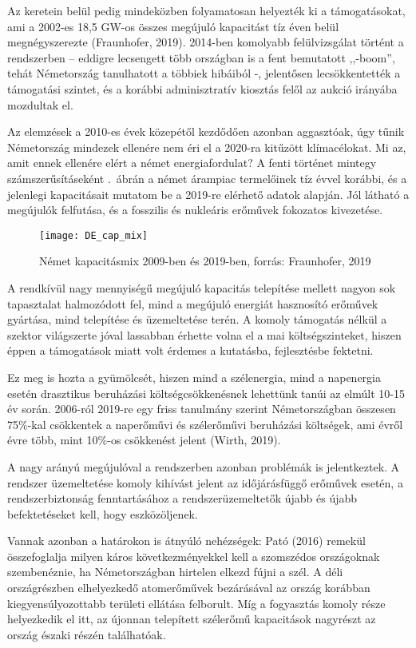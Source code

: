 \documentclass[twoside, magyar, showtrims]{corvinusphd}
\begin{document}
Az  keretein belül pedig
mindeközben folyamatosan helyezték ki a támogatásokat,
ami a 2002-es 18,5 GW-os összes megújuló
kapacitást tíz éven belül megnégyszerezte
(Fraunhofer, 2019).
2014-ben komolyabb felülvizsgálat történt a rendszerben -- 
eddigre lecsengett több országban is a
fent bemutatott ,,-boom'', tehát Németország
tanulhatott a többiek hibáiból -,
jelentősen lecsökkentették a támogatási szintet,
és a korábbi adminisztratív kiosztás felől 
az aukció irányába mozdultak el.

Az elemzések a 2010-es évek közepétől
kezdődően azonban aggasztóak, úgy tűnik
Németország mindezek ellenére nem éri el
a 2020-ra kitűzött klímacélokat. 
Mi az, amit ennek ellenére elért a német energiafordulat? 
A fenti történet mintegy számszerűsításeként .~ábrán
a német árampiac termelőinek tíz évvel korábbi,
és a jelenlegi kapacitásait mutatom be a
2019-re elérhető adatok alapján. Jól látható a megújulók
felfutása, és a fosszilis és nukleáris erőművek fokozatos kivezetése.

\begin{figure}
    \centering
    \texttt{[image: DE\_cap\_mix]}
    \caption{Német kapacitásmix 2009-ben és 2019-ben, forrás: Fraunhofer, 2019}
    \label{fig:DE_cap_mix}
\end{figure}

A rendkívül nagy mennyiségű megújuló
kapacitás telepítése mellett nagyon sok tapasztalat
halmozódott fel, mind a megújuló energiát hasznosító
erőművek gyártása, mind telepítése és üzemeltetése
terén. A komoly támogatás nélkül a szektor
világszerte jóval lassabban érhette volna el a mai költségszinteket,
hiszen éppen a támogatások miatt
volt érdemes a kutatásba, fejlesztésbe fektetni.

Ez meg is hozta a gyümölcsét, hiszen mind a szélenergia,
mind a napenergia esetén drasztikus
beruházási költségcsökkenésnek
lehettünk tanúi az elmúlt 10-15 év során.
2006-ról 2019-re egy friss tanulmány
szerint Németországban összesen 75\%-kal
csökkentek a naperőművi és szélerőművi 
beruházási költségek, ami évről évre több,
mint 10\%-os csökkenést jelent (Wirth, 2019).
\label{invcsokken}

A nagy arányú megújulóval a rendszerben
azonban problémák is jelentkeztek.
A rendszer üzemeltetése komoly kihívást
jelent az időjárásfüggő erőművek esetén,
a rendszerbiztonság fenntartásához a rendszerüzemeltetők
újabb és újabb befektetéseket
kell, hogy eszközöljenek.

Vannak azonban a határokon is átnyúló nehézségek:
Pató (2016) remekül összefoglalja
milyen káros következményekkel kell
a szomszédos országoknak szembenéznie,
ha Németországban hirtelen elkezd fújni a szél. 
A déli országrészben elhelyezkedő atomerőművek
bezárásával az ország korábban kiegyensúlyozottabb
területi ellátása felborult. Míg a fogyasztás komoly
része helyezkedik el itt, az újonnan telepített
szélerőmű kapacitások nagyrészt 
az ország északi részén találhatóak.
\end{document}
